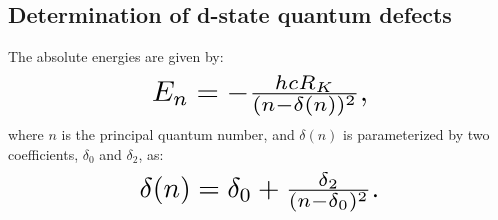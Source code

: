 \documentclass[landscape]{sciposter}
\begin{document}
\begin{multicols}{4}

\section*{\large Determination of d-state quantum defects}
The absolute energies are given by:
\begin{equation*}
\resizebox{0.45\hsize}{!}{$E_n = -\frac{hcR_K}{(n - \delta(n))^2},$}
\end{equation*}
where $n$ is the principal quantum number, and $\delta(n)$ is parameterized by two coefficients, $\delta_0$ and $\delta_2$, as:
\begin{equation*}
\resizebox{0.5\hsize}{!}{$\delta(n) = \delta_0 + \frac{\delta_2}{(n-\delta_0)^2}.$}
\end{equation*}


\end{multicols}
\end{document}

